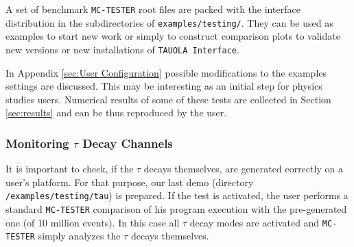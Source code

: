 \documentclass[]{Tauola_interface_design}
\begin{document}
A set of benchmark {\tt MC-TESTER} root files are packed with the interface
distribution in the subdirectories of {\tt examples/testing/}. They can be used
as examples to start new work or simply to construct comparison
plots to validate new versions or new installations of {\tt TAUOLA Interface}. 


In Appendix \ref{sec:User Configuration} possible  modifications to the  
examples settings 
are discussed. This may be interesting as an initial step for 
physics studies users.  Numerical results of some of these tests
are collected in Section \ref{sec:results}
and can be thus reproduced by the user.


\subsubsection{Monitoring $\tau$ Decay  Channels}

It is important to check, if  the $\tau$ decays themselves,
are generated correctly on a user's platform.
For that purpose, our last demo (directory {\tt /examples/testing/tau}) is prepared.  If the test is activated,
the user performs
a standard {\tt MC-TESTER} comparison of his program execution with the  pre-generated one (of 10 million events).
In this case all $\tau$ decay modes are activated and {\tt MC-TESTER} simply
analyzes the $\tau$ decays themselves.
\end{document}
